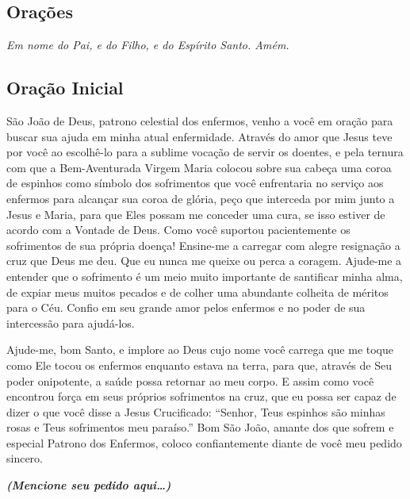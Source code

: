 \documentclass[18pt]{article}
\begin{document}
\begin{justify}

\newpage
\begin{center}
 \section{Orações}\label{sec:Orações} %
\textit{Em nome do Pai, e do Filho, e do Espírito Santo. Amém.}
\end{center}

\begin{center}
\subsection{Oração Inicial}\label{sec:Oração_Inicial} %
\end{center}

São João de Deus, patrono celestial dos enfermos, venho a você em oração para buscar sua ajuda em minha atual enfermidade. Através do amor que Jesus teve por você ao escolhê-lo para a sublime vocação de servir os doentes, e pela ternura com que a Bem-Aventurada Virgem Maria colocou sobre sua cabeça uma coroa de espinhos como símbolo dos sofrimentos que você enfrentaria no serviço aos enfermos para alcançar sua coroa de glória, peço que interceda por mim junto a Jesus e Maria, para que Eles possam me conceder uma cura, se isso estiver de acordo com a Vontade de Deus. Como você suportou pacientemente os sofrimentos de sua própria doença! Ensine-me a carregar com alegre resignação a cruz que Deus me deu. Que eu nunca me queixe ou perca a coragem. Ajude-me a entender que o sofrimento é um meio muito importante de santificar minha alma, de expiar meus muitos pecados e de colher uma abundante colheita de méritos para o Céu. Confio em seu grande amor pelos enfermos e no poder de sua intercessão para ajudá-los.

Ajude-me, bom Santo, e implore ao Deus cujo nome você carrega que me toque como Ele tocou os enfermos enquanto estava na terra, para que, através de Seu poder onipotente, a saúde possa retornar ao meu corpo. E assim como você encontrou força em seus próprios sofrimentos na cruz, que eu possa ser capaz de dizer o que você disse a Jesus Crucificado: “Senhor, Teus espinhos são minhas rosas e Teus sofrimentos meu paraíso.” Bom São João, amante dos que sofrem e especial Patrono dos Enfermos, coloco confiantemente diante de você meu pedido sincero.

\textit{\textbf{(Mencione seu pedido aqui…)}}


\end{justify}
\end{document}
